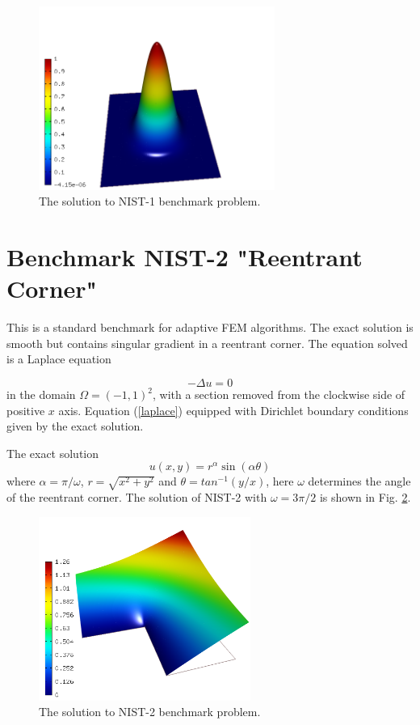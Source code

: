 \documentclass[12pt]{elsarticle}
\begin{document}
\begin{figure}[!ht]
\centering
\includegraphics[height=6cm]{nist/nist-1/solution.png}
\caption{The solution to NIST-1 benchmark problem.}
\label{fig:sln-nist01}
\end{figure}

\section{Benchmark NIST-2 "Reentrant Corner"}
\label{sec:bench-2}

This is a standard benchmark for adaptive FEM algorithms.
The exact solution is smooth but contains singular gradient in a reentrant corner.
The equation solved is a Laplace equation

\begin{equation} \label{laplace}
-\Delta u = 0
\end{equation}
in the domain $\Omega = (-1, 1)^2$, with a section
removed from the clockwise side of positive $x$ axis.
Equation (\ref{laplace}) equipped with Dirichlet
boundary conditions given by the exact solution.

The exact solution
\begin{equation}\label{exact-nist-2}
u(x, y) = r^{\alpha}\sin(\alpha \theta)
\end{equation}
where $\alpha = \pi / \omega$, $r = \sqrt{x^2+y^2}$ and $\theta = tan^{-1}(y/x)$, here $\omega $ determines
the angle of the reentrant corner.
The solution of NIST-2 with $\omega = 3 \pi / 2$  is shown in Fig. \ref{fig:sln-nist02}.

\begin{figure}[!ht]
\centering
\includegraphics[height=6cm]{nist/nist-2/solution.png}
\caption{The solution to NIST-2 benchmark problem.}
\label{fig:sln-nist02}
\end{figure}
\end{document}
